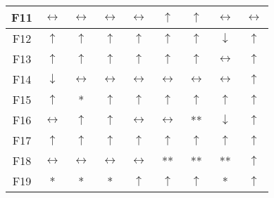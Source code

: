 \begin{table}[!t]
\begin{scriptsize}
\begin{tabular}{c c c c c c c c c}
F11	 & $\leftrightarrow$ & $\leftrightarrow$  & $\leftrightarrow$  & $\leftrightarrow$  & $\uparrow$         & $\uparrow$         & $\leftrightarrow$  & $\leftrightarrow$ \\ \hline 
F12	 & $\uparrow$        & $\uparrow$         & $\uparrow$         & $\uparrow$         & $\uparrow$         & $\uparrow$         & $\downarrow$       & $\uparrow$ \\ \hline 
F13	 & $\uparrow$        & $\uparrow$         & $\uparrow$         & $\uparrow$         & $\uparrow$         & $\uparrow$         & $\leftrightarrow$  & $\uparrow$ \\ \hline 
F14	 & $\downarrow$      & $\leftrightarrow$  & $\leftrightarrow$  & $\leftrightarrow$  & $\leftrightarrow$  & $\leftrightarrow$  & $\leftrightarrow$  & $\uparrow$ \\ \hline 
F15	 & $\uparrow$        & *                  & $\uparrow$         & $\uparrow$         & $\uparrow$         & $\uparrow$         & $\uparrow$         & $\uparrow$ \\ \hline 
F16	 & $\leftrightarrow$ & $\uparrow$         & $\uparrow$         & $\leftrightarrow$  & $\leftrightarrow$  & **                 & $\downarrow$       & $\uparrow$ \\ \hline 
F17	 & $\uparrow$        & $\uparrow$         & $\uparrow$         & $\uparrow$         & $\uparrow$         & $\uparrow$         & $\uparrow$         & $\uparrow$ \\ \hline 
F18	 & $\leftrightarrow$ & $\leftrightarrow$  & $\leftrightarrow$  & $\leftrightarrow$  & **                 & **                 & **                 & $\uparrow$ \\ \hline 
F19	 & *                 & *                  & *                  & $\uparrow$         & $\uparrow$         & $\uparrow$         & *                  & $\uparrow$ \\ \hline 
\end{tabular}
\end{scriptsize}
\end{table}
